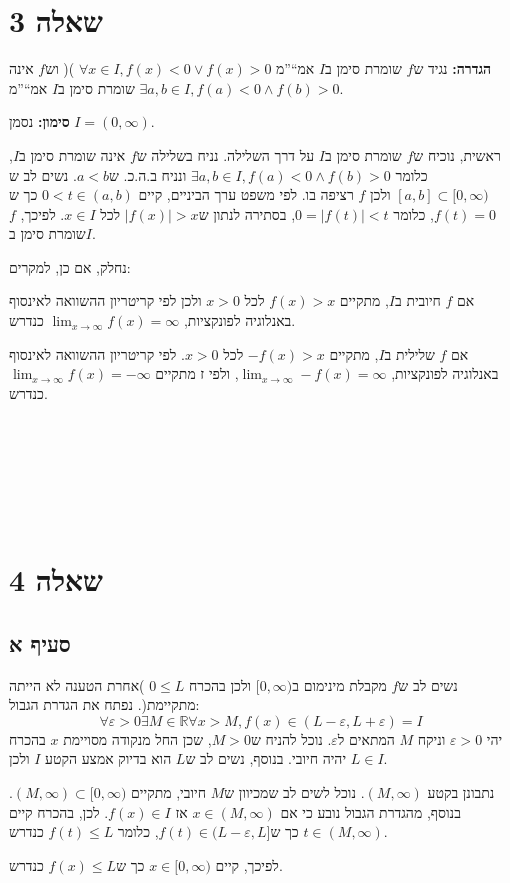 \documentclass[11pt, oneside]{article}
\newcommand{\qed}{\R{$\blacksquare$}}
\newcommand{\br}{\\\\\\\\\\\\\\}
\newcommand{\mR}{\mathbb{R}}
\newcommand{\m}[3]{\R{משפט #3#2.#1}}
\begin{document}
\section*{שאלה 3}
\textbf{הגדרה: }נגיד ש$f$ שומרת סימן ב$I$ אמ``''מ $\forall x \in I, f(x) < 0 \lor f(x) > 0$ )( וש$f$ אינה שומרת סימן ב$I$ אמ``''מ $\exists a, b \in I, f(a) < 0 \land f(b) > 0$.

\textbf{סימון: }נסמן $I = (0, \infty)$.

ראשית, נוכיח ש$f$ שומרת סימן ב$I$ על דרך השלילה. נניח בשלילה ש$f$ אינה שומרת סימן ב$I$, כלומר $\exists a, b \in I, f(a) < 0 \land f(b) > 0$ ונניח ב.ה.כ. ש$a < b$. נשים לב ש$[a, b] \subset [0, \infty)$ ולכן $f$ רציפה בו.
לפי משפט ערך הביניים, קיים $0 < t \in (a, b)$ כך ש$f(t) = 0$, כלומר $0 = |f(t)| < t$, בסתירה לנתון ש$|f(x)| > x$ לכל $x \in I$. לפיכך, $f$ שומרת סימן ב$I$.

נחלק, אם כן, למקרים:

אם $f$ חיובית ב$I$, מתקיים $f(x) > x$ לכל $x > 0$ ולכן לפי קריטריון ההשוואה לאינסוף באנלוגיה לפונקציות, $\lim_{x \to \infty} f(x) = \infty$ כנדרש.

אם $f$ שלילית ב$I$, מתקיים $-f(x) > x$ לכל $x > 0$. לפי קריטריון ההשוואה לאינסוף באנלוגיה לפונקציות, $\lim_{x \to \infty} -f(x) = \infty$, ולפי \m{4}{35}{}ז מתקיים $\lim_{x \to \infty} f(x) = -\infty$ כנדרש.
\br\qed
\clearpage

\section*{שאלה 4}
\subsection*{סעיף א}
נשים לב ש$f$ מקבלת מינימום ב$[0, \infty)$ ולכן בהכרח $0 \le L$ )אחרת הטענה לא הייתה מתקיימת(. נפתח את הגדרת הגבול:
\[
\forall \varepsilon > 0 \exists M \in \mR \forall x > M, f(x) \in (L - \varepsilon, L + \varepsilon) = I
\]
יהי $\varepsilon > 0$ וניקח $M$ המתאים ל$\varepsilon$. נוכל להניח ש$M > 0$, שכן החל מנקודה מסויימת $x$ בהכרח יהיה חיובי. בנוסף, נשים לב ש$L$ הוא בדיוק אמצע הקטע $I$ ולכן $L \in I$. 

נתבונן בקטע $(M, \infty)$. נוכל לשים לב שמכיוון ש$M$ חיובי, מתקיים $(M, \infty) \subset [0, \infty)$. בנוסף, מהגדרת הגבול נובע כי אם $x \in (M, \infty)$ אז $f(x) \in I$. לכן, בהכרח קיים $t \in (M, \infty)$ כך ש$f(t) \in (L - \varepsilon, L]$, כלומר $f(t) \le L$ כנדרש.

לפיכך, קיים $x \in [0, \infty)$ כך ש$f(x) \le L$ כנדרש.
\br\qed
\end{document}
